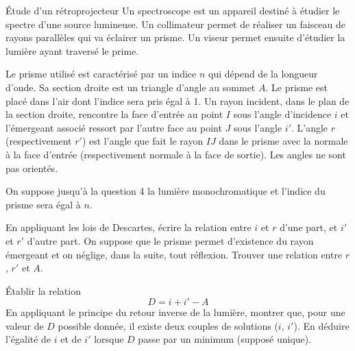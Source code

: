\begin{exo}[PCSI]{\'Etude d'un rétroprojecteur}
Un spectroscope est un appareil destiné à étudier le spectre d'une source lumineuse. Un collimateur permet de réaliser un faisceau de rayons parallèles qui va éclairer un prisme. Un viseur permet ensuite d'étudier la lumière ayant traversé le prime.

Le prisme utilisé est caractérisé par un indice $n$ qui dépend de la longueur d'onde. Sa section droite est un triangle d'angle au sommet $A$. Le prisme est placé dans l'air dont l'indice sera pris égal à 1. Un rayon incident, dans le plan de la section droite, rencontre la face d'entrée au point $I$ sous l'angle d'incidence $i$ et l'émergeant associé ressort par l'autre face au point $J$ sous l'angle $i'$. L'angle $r$ (respectivement $r'$) est l'angle que fait le rayon $IJ$ dans le prisme avec la normale à la face d'entrée (respectivement normale à la face de sortie). Les angles ne sont pas orientés.

On suppose jusqu'à la question 4 la lumière monochromatique et l'indice du prisme sera égal à $n$.
\begin{quest}
\item En appliquant les lois de Descartes, écrire la relation entre $i$ et $r$ d'une part, et $i'$ et $r'$ d'autre part. On suppose que le prisme permet d'existence du rayon émergeant et on néglige, dans la suite, tout réflexion. Trouver une relation entre $r$, $r'$ et $A$.


\item \' Etablir la relation
\begin{equation*}
D = i + i' - A
\end{equation*}
En appliquant le principe du retour inverse de la lumière, montrer que, pour une valeur de $D$ possible donnée, il existe deux couples de solutions ($i$, $i'$). En déduire l'égalité de $i$ et de $i'$ lorsque $D$ passe par un minimum (supposé unique).



\end{quest}
\end{exo}
